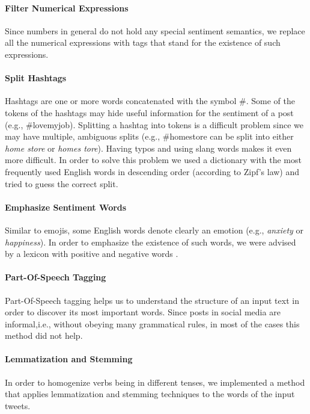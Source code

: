 \paragraph{\textbf{Filter Numerical Expressions}}
{\setlength{\parindent}{0cm}
Since numbers in general do not hold any special sentiment semantics,  
we replace all the numerical expressions with tags that stand for the existence of such expressions.}

\paragraph{\textbf{Split Hashtags}}
{\setlength{\parindent}{0cm}
Hashtags are one or more words concatenated with the symbol \#.
Some of the tokens of the hashtags may hide useful information for the sentiment of a post (e.g., \#lovemyjob).
Splitting a hashtag into tokens is a difficult problem \cite{Khaitan:2009:DCS:1645953.1645982} since we may have multiple, ambiguous splits (e.g., \#homestore can be split into either \textit{home store} or \textit{homes tore}). 
Having typos and using slang words makes it even more difficult.
In order to solve this problem we used a dictionary with the most frequently used English words in descending order (according to Zipf's law) and tried to guess the correct split.}


\paragraph{\textbf{Emphasize Sentiment Words}}
{\setlength{\parindent}{0cm}
Similar to emojis, some English words denote clearly an emotion (e.g., \textit{anxiety} or \textit{happiness}). 
In order to emphasize the existence of such words, we were advised by a lexicon with positive and negative words \cite{hu2004mining}.}


\paragraph{\textbf{Part-Of-Speech Tagging}}
{\setlength{\parindent}{0cm}
Part-Of-Speech tagging helps us to understand the structure of an input text in order to discover its most important words.
Since posts in social media are informal,i.e., without obeying many grammatical rules, in most of the cases this method did not help.}

\paragraph{\textbf{Lemmatization and Stemming}}
{\setlength{\parindent}{0cm}
In order to homogenize verbs being in different tenses, we implemented a method that applies lemmatization and stemming techniques to the words of the input tweets.}

